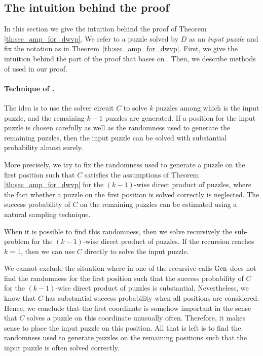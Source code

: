 %
\subsection{The intuition behind the proof}
\label{section:intuition}
In this section we give the intuition behind the proof of Theorem \ref{th:sec_amp_for_dwvp}.
We refer to a puzzle solved by $D$ as an \textit{input puzzle} and fix the notation as in Theorem~\ref{th:sec_amp_for_dwvp}.
First, we give the intuition behind the part of the proof that bases on \cite{canetti2005hardness, holenstein2011general}.
Then, we describe methods of \cite{dodis2009security} used in our proof.

\paragraph{Technique of \cite{canetti2005hardness, holenstein2011general}.}
The idea is to use the solver circuit $C$ to solve $k$ puzzles among which is the input puzzle, and
the remaining $k\!-\!1$ puzzles are generated.
If a position for the input puzzle is chosen carefully as well as the randomness used to generate the remaining puzzles,
then the input puzzle can be solved with substantial probability almost surely.

More precisely, we try to fix the randomness used to generate a puzzle on the first position such that $C$
satisfies the assumptions of Theorem \ref{th:sec_amp_for_dwvp}
for the $(k\!-\!1)$-wise direct product of puzzles, where the fact whether a puzzle on the first position is solved correctly is neglected.
The success probability of $C$ on the remaining puzzles can be estimated using a natural sampling technique.

When it is possible to find this randomness, then we solve recursively the sub-problem for the $(k\!-\!1)$-wise direct product of puzzles.
If the recursion reaches $k=1$, then we can use $C$ directly to solve the input puzzle.

We cannot exclude the situation where in one of the recursive calls $\operatorname{\text{Gen}}$ does not
find the randomness for the first position such that the success probability of $C$ for the $(k\!-\!1)$-wise direct product of puzzles is substantial.
Nevertheless, we know that $C$ has substantial success probability when all positions are considered.
Hence, we conclude that the first coordinate is somehow important in the sense that $C$ solves a puzzle on this coordinate unusually often.
Therefore, it makes sense to place the input puzzle on this position.
All that is left is to find the randomness used to generate puzzles on the remaining positions
such that the input puzzle is often solved correctly.

